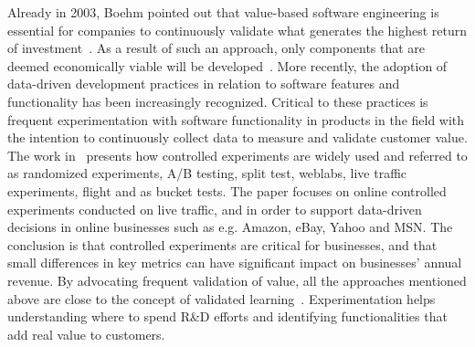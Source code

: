 \documentclass[12pt]{article}
\begin{document}
 Already in 2003, Boehm pointed out that value-based software
engineering is essential for companies to continuously validate
what generates the highest return of investment~\cite{Boehm2003}. 
As a
result of such an approach, only components that are deemed
economically viable will be developed~\cite{Biffl2005}.
More recently, the adoption of data-driven development practices
in relation to software features and functionality has been
increasingly recognized. Critical to these practices is frequent
experimentation with software functionality in products in the
field with the intention to continuously collect data to measure and validate customer value. 
The work in~\cite{Kohavi10} presents how controlled experiments are widely used and
referred to as randomized experiments, A/B testing, split test,
weblabs, live traffic experiments, flight and as bucket tests. %
The paper focuses on online controlled experiments
conducted on live traffic, and in order to support data-driven
decisions in online businesses such as e.g. Amazon, eBay, Yahoo
and MSN. The conclusion is that controlled experiments are critical
for businesses, and that small differences in key metrics can have
significant impact on businesses' annual revenue.
By advocating frequent validation of value, all the approaches
mentioned above are close to the concept of validated learning~\cite{LeanStartup11}. 
Experimentation helps
understanding where to spend R\&D efforts and identifying functionalities
that add real value to customers. 
\end{document}
